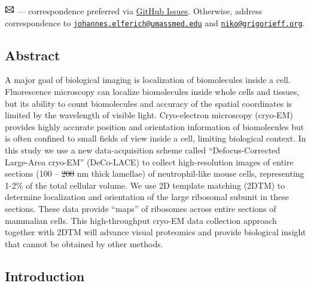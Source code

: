 \documentclass[
]{article}
\providecommand{\DIFaddtex}[1]{{\protect\color{blue}\uwave{#1}}} %
\providecommand{\DIFdeltex}[1]{{\protect\color{red}\sout{#1}}}                      %
\providecommand{\DIFaddbegin}{} %
\providecommand{\DIFaddend}{} %
\providecommand{\DIFdelbegin}{} %
\providecommand{\DIFdelend}{} %
\providecommand{\DIFadd}[1]{\texorpdfstring{\DIFaddtex{#1}}{#1}} %
\providecommand{\DIFdel}[1]{\texorpdfstring{\DIFdeltex{#1}}{}} %
\newcommand{\DIFscaledelfig}{0.5}
\newlength{\DIFdelgraphicswidth} %
\newlength{\DIFdelgraphicsheight} %
\newcommand{\DIFaddincludegraphics}[2][]{{\color{blue}\fbox{\DIFOincludegraphics[#1]{#2}}}} %
\newcommand{\DIFdelincludegraphics}[2][]{%
\sbox{\DIFdelgraphicsbox}{\DIFOincludegraphics[#1]{#2}}%
\settoboxwidth{\DIFdelgraphicswidth}{\DIFdelgraphicsbox} %
\settoboxtotalheight{\DIFdelgraphicsheight}{\DIFdelgraphicsbox} %
\scalebox{\DIFscaledelfig}{%
\parbox[b]{\DIFdelgraphicswidth}{\usebox{\DIFdelgraphicsbox}\\[-\baselineskip] \rule{\DIFdelgraphicswidth}{0em}}\llap{\resizebox{\DIFdelgraphicswidth}{\DIFdelgraphicsheight}{%
\setlength{\unitlength}{\DIFdelgraphicswidth}%
\begin{picture}(1,1)%
\thicklines\linethickness{2pt} %
{\color[rgb]{1,0,0}\put(0,0){\framebox(1,1){}}}%
{\color[rgb]{1,0,0}\put(0,0){\line( 1,1){1}}}%
{\color[rgb]{1,0,0}\put(0,1){\line(1,-1){1}}}%
\end{picture}%
}\hspace*{3pt}}} %
} %
\DeclareRobustCommand{\DIFaddbegin}{\DIFOaddbegin \let\includegraphics\DIFaddincludegraphics} %
\DeclareRobustCommand{\DIFaddend}{\DIFOaddend \let\includegraphics\DIFOincludegraphics} %
\DeclareRobustCommand{\DIFdelbegin}{\DIFOdelbegin \let\includegraphics\DIFdelincludegraphics} %
\DeclareRobustCommand{\DIFdelend}{\DIFOaddend \let\includegraphics\DIFOincludegraphics} %
\begin{document}
\leavevmode{}%
\includegraphics[width=0.16667in,height=0.16667in]{images/envelope.pdf} --- correspondence preferred via \href{https://github.com/jojoelfe/deco_lace_template_matching_manuscript/issues}{GitHub
Issues}.
Otherwise, address correspondence to \href{mailto:johannes.elferich@umassmed.edu}{\nolinkurl{johannes.elferich@umassmed.edu}}
and \href{mailto:niko@grigorieff.org}{\nolinkurl{niko@grigorieff.org}}.

\hypertarget{abstract}{%
\subsection{Abstract}\label{abstract}}

A major goal of biological imaging is localization of biomolecules
inside a cell. Fluorescence microscopy can localize biomolecules inside
whole cells and tissues, but its ability to count biomolecules and
accuracy of the spatial coordinates is limited by the wavelength of
visible light. Cryo-electron microscopy (cryo-EM) provides highly
accurate position and orientation information of biomolecules but is
often confined to small fields of view inside a cell, limiting
biological context. In this study we use a new data-acquisition scheme
called ``Defocus-Corrected Large-Area cryo-EM'' (DeCo-LACE) to collect
high-resolution images of entire sections (100 -- \DIFdelbegin \DIFdel{200 }\DIFdelend \DIFaddbegin \DIFadd{250 }\DIFaddend nm thick lamellae)
of neutrophil-like mouse cells, representing 1-2\% of the total cellular
volume. We use 2D template matching (2DTM) to determine localization and
orientation of the large ribosomal subunit in these sections. These data
provide ``maps'' of ribosomes across entire sections of mammalian cells.
This high-throughput cryo-EM data collection approach together with 2DTM
will advance visual proteomics and provide biological insight that
cannot be obtained by other methods.

\hypertarget{introduction}{%
\subsection{Introduction}\label{introduction}}
\end{document}
